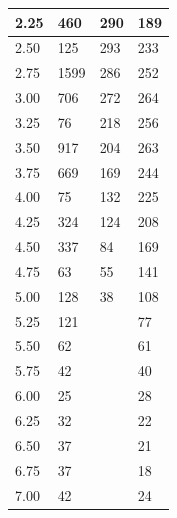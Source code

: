 \documentclass[12pt letterpaper]{article}
\begin{document}
\begin{table}[ht!]
\begin{tabular}{|l|p{2.5cm}|p{2.5cm}|p{2.5cm}|}
2.25             & 460                          & 290                        & 189                         \\ \hline
2.50             & 125                          & 293                        & 233                         \\ \hline
2.75             & 1599                         & 286                        & 252                         \\ \hline
3.00             & 706                          & 272                        & 264                         \\ \hline
3.25             & 76                           & 218                        & 256                         \\ \hline
3.50             & 917                          & 204                        & 263                         \\ \hline
3.75             & 669                          & 169                        & 244                         \\ \hline
4.00             & 75                           & 132                        & 225                         \\ \hline
4.25             & 324                          & 124                        & 208                         \\ \hline
4.50             & 337                          & 84                         & 169                         \\ \hline
4.75             & 63                           & 55                         & 141                         \\ \hline
5.00             & 128                          & 38                         & 108                         \\ \hline
5.25             & 121                          &                            & 77                          \\ \hline
5.50             & 62                           &                            & 61                          \\ \hline
5.75             & 42                           &                            & 40                          \\ \hline
6.00             & 25                           &                            & 28                          \\ \hline
6.25             & 32                           &                            & 22                          \\ \hline
6.50             & 37                           &                            & 21                          \\ \hline
6.75             & 37                           &                            & 18                          \\ \hline
7.00             & 42                           &                            & 24                          \\ \hline
\end{tabular}
\end{table}
\end{document}

